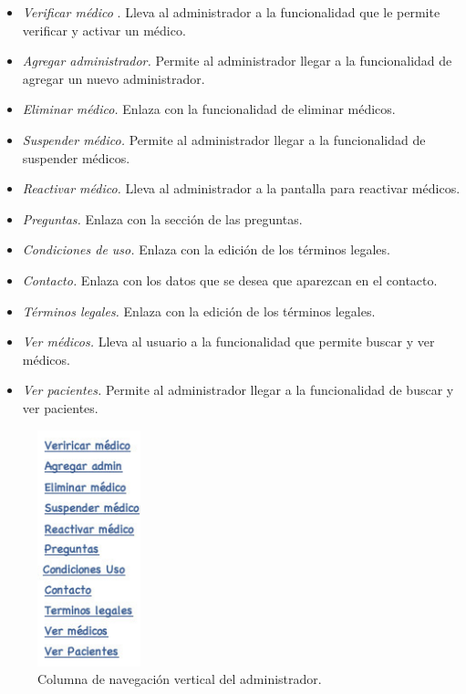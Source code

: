 \documentclass[a4paper,oneside,11pt]{book}
\begin{document}
		\begin{itemize}
			\item \textit{Verificar médico }. Lleva al administrador a la funcionalidad que le permite verificar y activar un médico.
			\item \textit{Agregar administrador.} Permite al administrador llegar a la funcionalidad de agregar un nuevo administrador.
			\item \textit{Eliminar médico.} Enlaza con la funcionalidad de eliminar médicos.
			\item \textit{Suspender médico.} Permite al administrador llegar a la funcionalidad de suspender médicos.
			\item \textit{Reactivar médico.} Lleva al administrador a la pantalla para reactivar médicos.
			\item \textit{Preguntas.} Enlaza con la sección de las preguntas.
			\item \textit{Condiciones de uso.} Enlaza con la edición de los términos legales.
			\item \textit{Contacto.} Enlaza con los datos que se desea que aparezcan en el contacto.
			\item \textit{Términos legales.} Enlaza con la edición de los términos legales.
			\item \textit{Ver médicos.} Lleva al usuario a la funcionalidad que permite buscar y ver médicos. 
			\item \textit{Ver pacientes.} Permite al administrador llegar a la funcionalidad de buscar y ver pacientes.
		\end{itemize}
		
		\begin{figure}[H]
		  \centering
		    \includegraphics[width=3cm]{img/jpg/nav/administrador_lat1.jpg}
		  \caption{Columna de navegación vertical del administrador.}
		  \label{fig:nav_administrador_lat1}
		\end{figure}
		
\end{document}
